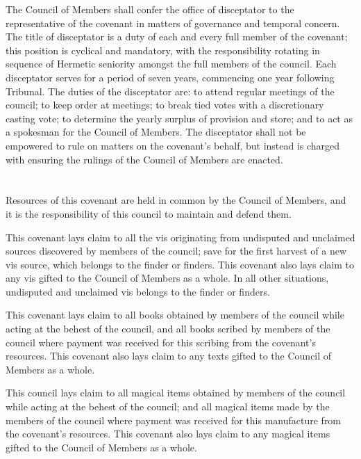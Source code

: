 \documentclass [a3paper,portrait,20pt]{article}
\begin{document}
\begin{multicols}{2}
\begin{small}
	The Council of Members shall confer the office of disceptator to the representative of the covenant in
	matters of governance and temporal concern. The title of disceptator is a duty of each and every full
	member of the covenant; this position is cyclical and mandatory, with the responsibility rotating in
	sequence of Hermetic seniority amongst the full members of the council. Each disceptator serves for a
	period of seven years, commencing one year following Tribunal. The duties of the disceptator are: to
	attend regular meetings of the council; to keep order at meetings; to break tied votes with a
	discretionary casting vote; to determine the yearly surplus of provision and store; and to act as a
	spokesman for the Council of Members. The disceptator shall not be empowered to rule on matters on the
	covenant's behalf, but instead is charged with ensuring the rulings of the Council of Members are
	enacted.
	
\section*{\fontsize{35}{40}\selectfont{Resources Owned by this Covenant}}
	Resources of this covenant are held in common by the Council of Members, and it is the responsibility
	of this council to maintain and defend them.
	
	This covenant lays claim to all the vis originating from undisputed and unclaimed sources discovered by
	members of the council; save for the first harvest of a new vis source, which belongs to the finder or
	finders. This covenant also lays claim to any vis gifted to the Council of Members as a whole. In all
	other situations, undisputed and unclaimed vis belongs to the finder or finders.
	
	This covenant lays claim to all books obtained by members of the council while acting at the behest of
	the council, and all books scribed by members of the council where payment was received for this
	scribing from the covenant's resources. This covenant also lays claim to any texts gifted to the Council
	of Members as a whole.
	
	This council lays claim to all magical items obtained by members of the council while acting at the
	behest of the council; and all magical items made by the members of the council where payment was
	received for this manufacture from the covenant's resources. This covenant also lays claim to any
	magical items gifted to the Council of Members as a whole.
	

\end{small}
\end{multicols}
\end{document}
